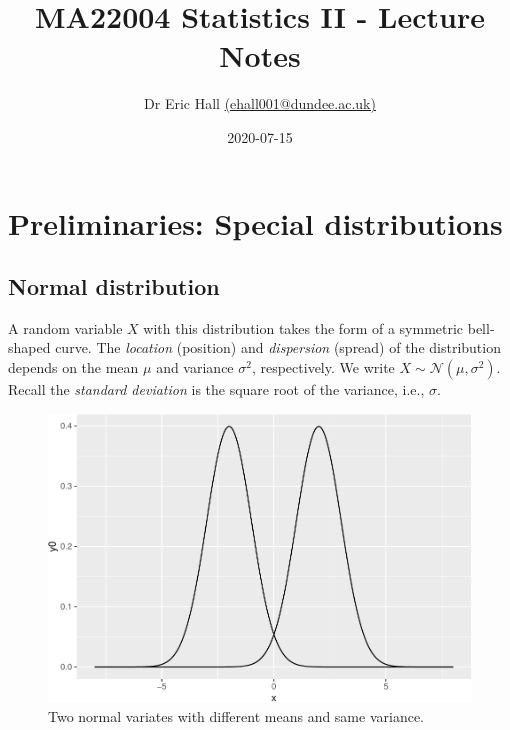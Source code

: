 \documentclass[
]{article}
\title{MA22004 Statistics II - Lecture Notes}
\author{Dr Eric Hall \href{mailto:ehall001@dundee.ac.uk}{(ehall001@dundee.ac.uk)}}
\date{2020-07-15}
\theoremstyle{definition}
\theoremstyle{definition}
\theoremstyle{definition}
\theoremstyle{remark}
\begin{document}
\maketitle

{
\setcounter{tocdepth}{2}
\tableofcontents
}
\hypertarget{special-dist}{%
\section{Preliminaries: Special distributions}\label{special-dist}}

\hypertarget{normal-distribution}{%
\subsection{Normal distribution}\label{normal-distribution}}

A random variable \(X\) with this distribution takes the form of a symmetric bell-shaped curve. The \emph{location} (position) and \emph{dispersion} (spread) of the distribution depends on the mean \(\mu\) and variance \(\sigma^2\), respectively. We write \(X \sim \mathcal{N}(\mu, \sigma^2)\). Recall the \emph{standard deviation} is the square root of the variance, i.e., \(\sigma\).

\begin{figure}
\centering
\includegraphics{index_files/figure-latex/normals-same-var-1.pdf}
\caption{\label{fig:normals-same-var}Two normal variates with different means and same variance.}
\end{figure}
\end{document}
